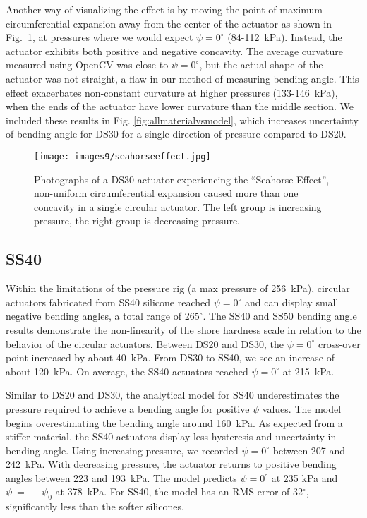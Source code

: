 Another way of visualizing the effect is by moving the point of maximum circumferential expansion away from the center of the actuator as shown in Fig.~\ref{fig:seahorseeffect}, at pressures where we would expect $\psi=0^\circ$ (84-112~kPa). Instead, the actuator exhibits both positive and negative concavity. The average curvature measured using OpenCV was close to $\psi=0^\circ$, but the actual shape of the actuator was not straight, a flaw in our method of measuring bending angle. This effect exacerbates non-constant curvature at higher pressures (133-146~kPa), when the ends of the actuator have lower curvature than the middle section. We included these results in Fig. \ref{fig:allmaterialvsmodel}, which increases uncertainty of bending angle for DS30 for a single direction of pressure compared to DS20.
\\
\begin{figure}[ht]
    \centering
     \texttt{[image: images9/seahorseeffect.jpg]}
    \caption{Photographs of a DS30 actuator experiencing the ``Seahorse Effect'', non-uniform circumferential expansion caused more than one concavity in a single circular actuator. The left group is increasing pressure, the right group is decreasing pressure.}
    \label{fig:seahorseeffect}
\end{figure}

\clearpage
\subsection{SS40}

Within the limitations of the pressure rig (a max pressure of 256~kPa), circular actuators fabricated from SS40 silicone reached $\psi=0^\circ$ and can display small negative bending angles, a total range of 265$^\circ$. The SS40 and SS50 bending angle results demonstrate the non-linearity of the shore hardness scale in relation to the behavior of the circular actuators. Between DS20 and DS30, the $\psi=0^\circ$ cross-over point increased by about 40~kPa. From DS30 to SS40, we see an increase of about 120~kPa. On average, the SS40 actuators reached $\psi=0^\circ$ at 215~kPa. 

Similar to DS20 and DS30, the analytical model for SS40 underestimates the pressure required to achieve a bending angle for positive $\psi$ values. The model begins overestimating the bending angle around 160~kPa. As expected from a stiffer material, the SS40 actuators display less hysteresis and uncertainty in bending angle. Using increasing pressure, we recorded $\psi=0^\circ$ between 207 and 242~kPa. With decreasing pressure, the actuator returns to positive bending angles between 223 and 193~kPa. The model predicts $\psi=0^\circ$ at 235 kPa and $\psi~=~-\psi_0$ at 378~kPa. For SS40, the model has an RMS error of 32$^\circ$, significantly less than the softer silicones. 

